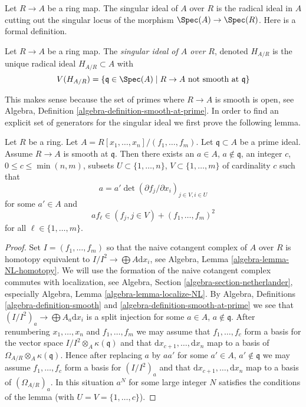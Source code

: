 \noindent
Let $R \to A$ be a ring map. The singular ideal of $A$ over $R$
is the radical ideal in $A$ cutting out the singular locus of the
morphism $\Spec(A) \to \Spec(R)$. Here is a formal definition.

\begin{definition}
\label{definition-singular-ideal}
Let $R \to A$ be a ring map. The {\it singular ideal of $A$ over $R$},
denoted $H_{A/R}$ is the unique radical ideal $H_{A/R} \subset A$ with
$$
V(H_{A/R}) = \{\mathfrak q \in \Spec(A) \mid R \to A
\text{ not smooth at }\mathfrak q\}
$$
\end{definition}

\noindent
This makes sense because the set of primes where $R \to A$ is smooth
is open, see
Algebra, Definition \ref{algebra-definition-smooth-at-prime}.
In order to find an explicit set
of generators for the singular ideal we first prove the following lemma.

\begin{lemma}
\label{lemma-find-strictly-standard}
Let $R$ be a ring. Let $A = R[x_1, \ldots, x_n]/(f_1, \ldots, f_m)$.
Let $\mathfrak q \subset A$ be a prime ideal. Assume $R \to A$ is smooth
at $\mathfrak q$. Then there exists an $a \in A$, $a \not \in \mathfrak q$,
an integer $c$, $0 \leq c \leq \min(n, m)$, subsets
$U \subset \{1, \ldots, n\}$, $V \subset \{1, \ldots, m\}$
of cardinality $c$ such that
$$
a = a' \det(\partial f_j/\partial x_i)_{j \in V, i \in U}
$$
for some $a' \in A$ and
$$
a f_\ell \in (f_j, j \in V) + (f_1, \ldots, f_m)^2
$$
for all $\ell \in \{1, \ldots, m\}$.
\end{lemma}

\begin{proof}
Set $I = (f_1, \ldots, f_m)$ so that the naive cotangent
complex of $A$ over $R$ is homotopy equivalent to
$I/I^2 \to \bigoplus A\text{d}x_i$, see
Algebra, Lemma \ref{algebra-lemma-NL-homotopy}.
We will use the formation of the naive cotangent complex commutes with
localization, see Algebra, Section \ref{algebra-section-netherlander},
especially Algebra, Lemma \ref{algebra-lemma-localize-NL}.
By Algebra, Definitions \ref{algebra-definition-smooth} and
\ref{algebra-definition-smooth-at-prime}
we see that $(I/I^2)_a \to \bigoplus A_a\text{d}x_i$
is a split injection for some $a \in A$, $a \not \in \mathfrak q$.
After renumbering $x_1, \ldots, x_n$ and $f_1, \ldots, f_m$ we may
assume that $f_1, \ldots, f_c$ form a basis for
the vector space $I/I^2 \otimes_A \kappa(\mathfrak q)$ and that
$\text{d}x_{c + 1}, \ldots, \text{d}x_n$ map to a basis of
$\Omega_{A/R} \otimes_A \kappa(\mathfrak q)$. Hence after replacing $a$
by $aa'$ for some $a' \in A$, $a' \not \in \mathfrak q$ we may assume
$f_1, \ldots, f_c$ form a basis for $(I/I^2)_a$ and that
$\text{d}x_{c + 1}, \ldots, \text{d}x_n$ map to a basis of
$(\Omega_{A/R})_a$. In this situation $a^N$ for some large integer
$N$ satisfies the conditions of the lemma (with $U = V = \{1, \ldots, c\}$).
\end{proof}

